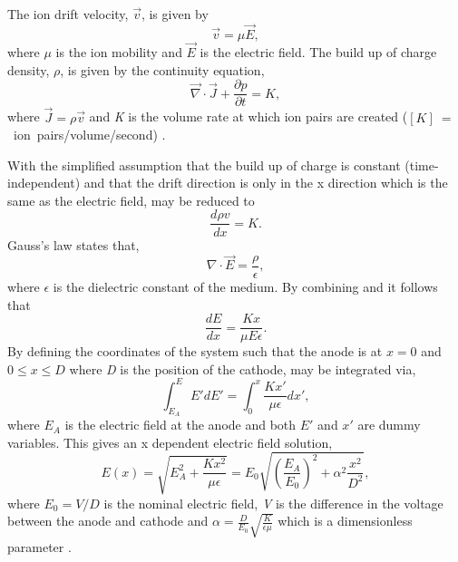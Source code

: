 The ion drift velocity, $\vec v$, is given by
\begin{equation}
    \vec v = \mu \vec E,
\end{equation}
where $\mu$ is the ion mobility and $\vec E$ is the electric field. The build up of charge density, $\rho$, is given by the continuity equation,
\begin{equation}
    \vec \nabla \cdot \vec J + \frac{\partial p}{\partial t} = K,
\label{eq:space_charge_continuity}
\end{equation}
where $\vec J = \rho \vec v$ and \textit{K} is the volume rate at which ion pairs are created \newline ($[K]~=~$~ion~pairs/volume/second) \cite{space_charge_math}. 

With the simplified assumption that the build up of charge is constant (time-independent) and that the drift direction is only in the x direction which is the same as the electric field,  may be reduced to 
\begin{equation}
    \frac{d \rho v}{dx} = K.
\label{eq:reduced_sapce_charge_continuity}
\end{equation}
Gauss's law states that,
\begin{equation}
    \nabla \cdot \vec E = \frac{\rho}{\epsilon},
\label{eq:Gauss's_law}
\end{equation}
where $\epsilon$ is the dielectric constant of the medium.
By combining  and  it follows that
\begin{equation}
    \frac{dE}{dx} = \frac{Kx}{\mu E \epsilon}.
\label{eq:sc_gauss_combo}
\end{equation}
By defining the coordinates of the system such that the anode is at $x = 0$ and $0 \leq x \leq D$ where \textit{D} is the position of the cathode,  may be integrated via,
\begin{equation}
    \int_{E_A}^E E'dE' = \int_0^x \frac{Kx'}{\mu \epsilon}dx',
\end{equation}
where $E_A$ is the electric field at the anode and both $E'$ and $x'$ are dummy variables. This gives an x dependent electric field solution,
\begin{equation}
    E(x) = \sqrt{E^2_A + \frac{Kx^2}{\mu \epsilon}} = E_0 \sqrt{\left (\frac{E_A}{E_0}\right ) ^2 + \alpha^2 \frac{x^2}{D^2}},
\end{equation}
where $E_0 = V/D$ is the nominal electric field, \textit{V} is the difference in the voltage between the anode and cathode and $\alpha = \frac{D}{E_0}\sqrt{\frac{K}{\epsilon \mu}}$ which is a dimensionless parameter \cite{space_charge_math}.


